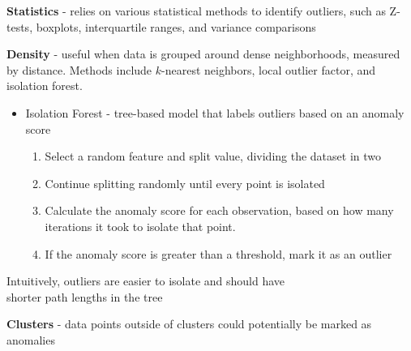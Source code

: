 \documentclass[10pt,landscape]{article}
\begin{document}
\begin{multicols}{3}
        \textbf{Statistics} - relies on various statistical methods to identify outliers, such as Z-tests, boxplots, interquartile ranges, and variance comparisons

        \textbf{Density} - useful when data is grouped around dense neighborhoods, measured by distance. Methods include $k$-nearest neighbors, local outlier factor, and isolation forest.
        \begin{itemize}[label={--},leftmargin=4mm]
            \itemsep -.4mm
            \item Isolation Forest - tree-based model that labels outliers based on an anomaly score\\
                  \vspace{-1.5mm}
                  \begin{enumerate}[leftmargin=4mm]
                      \itemsep -.4mm
                      \item Select a random feature and split value, dividing the dataset in two
                      \item Continue splitting randomly until every point is isolated
                      \item Calculate the anomaly score for each observation, based on how many iterations it took to isolate that point.
                      \item If the anomaly score is greater than a threshold, mark it as an outlier
                  \end{enumerate}
        \end{itemize}
        \vspace{-2.5mm}
        \hspace{4mm}Intuitively, outliers are easier to isolate and should have\\\hspace{4mm}shorter path lengths in the tree

        \vspace{1mm}
        \textbf{Clusters} - data points outside of clusters could potentially be marked as anomalies


\end{multicols}
\end{document}
